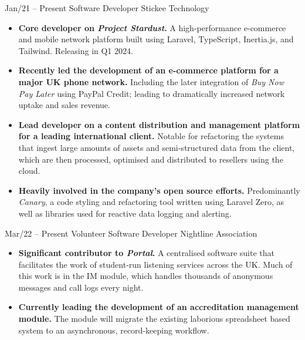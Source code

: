 \documentclass[9pt]{developercv} %
\begin{document}
\vspace{-10 pt}
\begin{entrylist}
	\entry
        {Jan/21 -- Present}
		{Software Developer}
		{Stickee Technology}
		{\vspace{-10pt}
        \begin{itemize}[noitemsep,topsep=0pt,parsep=0pt,partopsep=0pt, leftmargin=-1pt]
            \item \textbf{Core developer on \textit{Project Stardust}.} A high-performance e-commerce and mobile network platform built using Laravel, TypeScript, Inertia.js, and Tailwind. Releasing in Q1 2024.
            \item \textbf{Recently led the development of an e-commerce platform for a major UK phone network.} Including the later integration of \textit{Buy Now Pay Later} using PayPal Credit; leading to dramatically increased network uptake and sales revenue. 
            \item \textbf{Lead developer on a content distribution and management platform for a leading international client. } Notable for refactoring the systems that ingest large amounts of assets and semi-structured data from the client, which are then processed, optimised and distributed to resellers using the cloud.
            \item \textbf{Heavily involved in the company's open source efforts. }Predominantly \textit{Canary}, a code styling and refactoring tool written using Laravel Zero, as well as libraries used for reactive data logging and alerting.
        \end{itemize} 
        }
	\entry
		{Mar/22 -- Present}
		{Volunteer Software Developer}
		{Nightline Association}
		{\vspace{-10pt}
        \begin{itemize}[noitemsep,topsep=0pt,parsep=0pt,partopsep=0pt, leftmargin=-1pt]
            \item \textbf{Significant contributor to \textit{Portal}.} A centralised software suite that facilitates the work of student-run listening services across the UK. Much of this work is in the IM module, which handles thousands of anonymous messages and call logs every night.
            \item \textbf{Currently leading the development of an accreditation management module.} The module will migrate the existing laborious spreadsheet based system to an asynchronous, record-keeping workflow.

\end{itemize}}
\end{entrylist}
\end{document}
